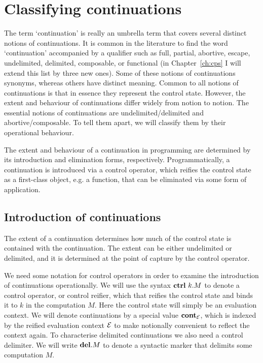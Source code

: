 \documentclass[12pt,phd,lfcs,twoside,openright,logo,leftchapter,normalheadings]{infthesis}
\theoremstyle{plain}
\theoremstyle{definition}
\begin{document}
\section{Classifying continuations}
\label{sec:classifying-continuations}

The term `continuation' is really an umbrella term that covers several
distinct notions of continuations. It is common in the literature to
find the word `continuation' accompanied by a qualifier such as full,
partial, abortive, escape, undelimited, delimited, composable, or
functional (in Chapter~\ref{ch:cps} I will extend this list by three
new ones). Some of these notions of continuations synonyms, whereas
others have distinct meaning. Common to all notions of continuations
is that in essence they represent the control state. However, the
extent and behaviour of continuations differ widely from notion to
notion. The essential notions of continuations are
undelimited/delimited and abortive/composable. To tell them apart, we
will classify them by their operational behaviour.

The extent and behaviour of a continuation in programming are
determined by its introduction and elimination forms,
respectively. Programmatically, a continuation is introduced via a
control operator, which reifies the control state as a first-class
object, e.g. a function, that can be eliminated via some form of
application.

\subsection{Introduction of continuations}
%
The extent of a continuation determines how much of the control state
is contained with the continuation.
%
The extent can be either undelimited or delimited, and it is
determined at the point of capture by the control operator.
%

We need some notation for control operators in order to examine the
introduction of continuations operationally. We will use the syntax
$\mathbf{ctrl}~k.M$ to denote a control operator, or control reifier, which that
reifies the control state and binds it to $k$ in the computation
$M$. Here the control state will simply be an evaluation context. We
will denote continuations by a special value $\mathbf{cont}_{\mathcal{E}}$, which is
indexed by the reified evaluation context $\mathcal{E}$ to make notionally
convenient to reflect the context again. To characterise delimited
continuations we also need a control delimiter. We will write
$\mathbf{del}.M$ to denote a syntactic marker that delimits some
computation $M$.
\end{document}

